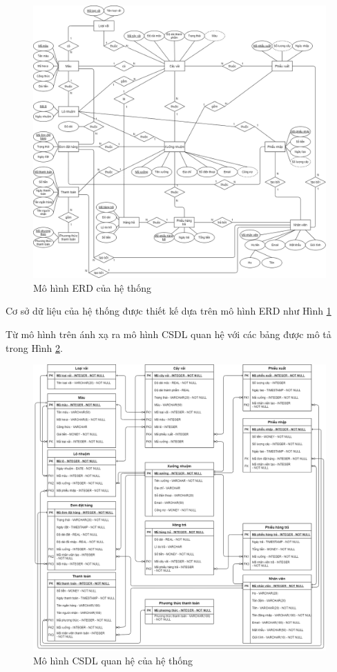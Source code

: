\begin{figure}[H]
    \begin{center}
        \includegraphics[width=17cm]{Image/General/ERD.png}
        \caption{Mô hình ERD của hệ thống}
        \label{erd}
    \end{center}
\end{figure}
\newpage
Cơ sở dữ liệu của hệ thống được thiết kế dựa trên mô hình  ERD như Hình \ref{erd}

Từ mô hình trên ánh xạ ra mô hình CSDL quan hệ với các bảng được mô tả trong Hình \ref{relation_model}.

\begin{figure}[H]
    \begin{center}
        \includegraphics[width=17cm]{Image/General/Relational Data Model.png}
        \caption{Mô hình CSDL quan hệ của hệ thống}
        \label{relation_model}
    \end{center}
\end{figure}

